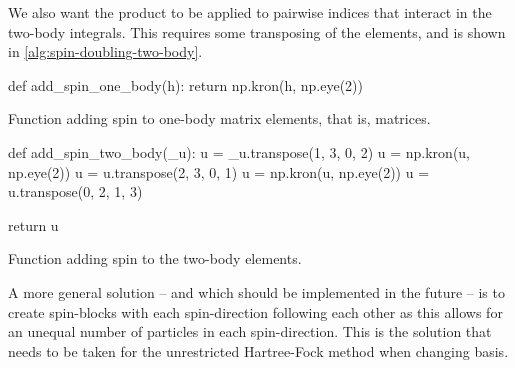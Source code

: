        We also want the product to be applied to pairwise indices that interact
        in the two-body integrals.
        This requires some transposing of the elements, and is shown in
        \autoref{alg:spin-doubling-two-body}.
        \begin{algorithm}
            \begin{python}
def add_spin_one_body(h):
    return np.kron(h, np.eye(2))
            \end{python}
            \caption{Function adding spin to one-body matrix elements, that is,
            matrices.}
            \label{alg:spin-doubling-one-body}
        \end{algorithm}
        \begin{algorithm}
            \begin{python}
def add_spin_two_body(_u):
    u = _u.transpose(1, 3, 0, 2)
    u = np.kron(u, np.eye(2))
    u = u.transpose(2, 3, 0, 1)
    u = np.kron(u, np.eye(2))
    u = u.transpose(0, 2, 1, 3)

    return u
            \end{python}
            \caption{Function adding spin to the two-body elements.}
            \label{alg:spin-doubling-two-body}
        \end{algorithm}

        A more general solution -- and which should be implemented in the future
        -- is to create spin-blocks with each spin-direction following each
        other as this allows for an unequal number of particles in each
        spin-direction.
        This is the solution that needs to be taken for the unrestricted
        Hartree-Fock method when changing basis.

